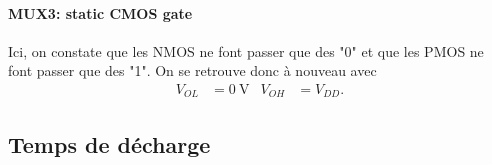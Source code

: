 \documentclass[frenchb,DIV=14]{scrartcl}
\begin{document}
\paragraph{MUX3: static CMOS gate}
Ici, on constate que les NMOS ne font passer que des "0" et que les PMOS ne
font passer que des "1". On se retrouve donc à nouveau avec
\begin{align*}
	V_{OL} &= \SI{0}{\volt} & V_{OH} &= V_{DD}.
\end{align*}

\subsection*{Temps de décharge}
\end{document}
